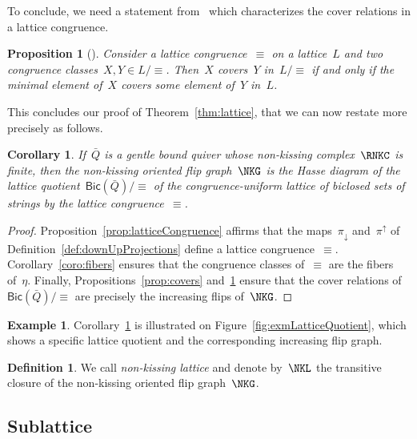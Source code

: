 \documentclass{amsart}
\newtheorem{corollary}[theorem]{Corollary}
\newtheorem{proposition}[theorem]{Proposition}
\theoremstyle{definition}
\newtheorem{definition}[theorem]{Definition}
\newtheorem{example}[theorem]{Example}
\newcommand{\fref}[1]{Figure~\ref{#1}} %
\newcommand{\darkblue}{\color{darkblue}} %
\newcommand{\defn}[1]{\textsl{\darkblue #1}} %
\newcommand{\Bicl}[1]{\mathsf{Bic}(#1)} %
\newcommand{\projDown}{\pi_\downarrow} %
\newcommand{\projUp}{\pi^\uparrow} %
\begin{document}
To conclude, we need a statement from~\cite{Reading-HopfAlgebras} which characterizes the cover relations in a lattice congruence.

\begin{proposition}[{\cite[Prop.~2.2]{Reading-HopfAlgebras}}]
\label{prop:characterizationCoversLatticeQuotient}
Consider a lattice congruence~$\equiv$ on a lattice~$L$ and two congruence classes~$X, Y \in L/{\equiv}$.
Then~$X$ covers~$Y$ in~$L/{\equiv}$ if and only if the minimal element of~$X$ covers some element of~$Y$ in~$L$.
\end{proposition}

This concludes our proof of Theorem~\ref{thm:lattice}, that we can now restate more precisely as follows.

\begin{corollary}
\label{coro:finalLatticeQuotient}
If~$\bar Q$ is a gentle bound quiver whose non-kissing complex~$\RNKC$ is finite, then the non-kissing oriented flip graph~$\NKG$ is the Hasse diagram of the lattice quotient~$\Bicl{\bar Q}/{\equiv}$ of the congruence-uniform lattice of biclosed sets of strings by the lattice congruence~$\equiv$.
\end{corollary}

\begin{proof}
Proposition~\ref{prop:latticeCongruence} affirms that the maps~$\projDown$ and~$\projUp$ of Definition~\ref{def:downUpProjections} define a lattice congruence~$\equiv$.
Corollary~\ref{coro:fibers} ensures that the congruence classes of~$\equiv$ are the fibers of~$\eta$.
Finally, Propositions~\ref{prop:covers} and~\ref{prop:characterizationCoversLatticeQuotient} ensure that the cover relations of~$\Bicl{\bar Q}/{\equiv}$ are precisely the increasing flips of~$\NKG$.
\end{proof}

\begin{example}
Corollary~\ref{coro:finalLatticeQuotient} is illustrated on \fref{fig:exmLatticeQuotient}, which shows a specific lattice quotient and the corresponding increasing flip graph.
\end{example}

\begin{definition}
We call \defn{non-kissing lattice} and denote by~$\NKL$ the transitive closure of the non-kissing oriented flip graph~$\NKG$.
\end{definition}

\subsection{Sublattice}
\end{document}
